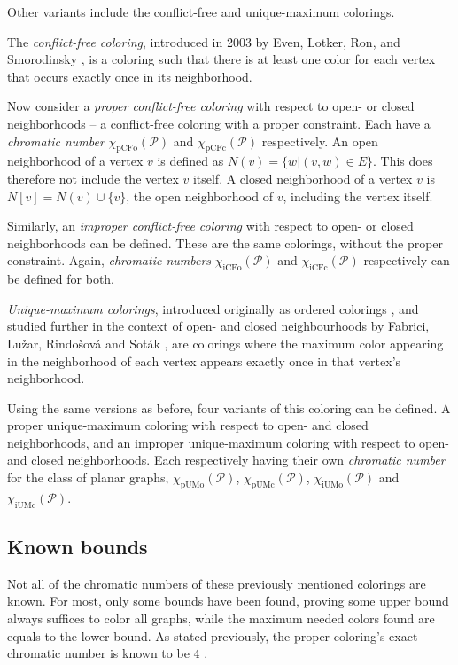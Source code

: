 \documentclass{article}
\begin{document}
Other variants include the conflict-free and unique-maximum colorings. 

The \textit{conflict-free coloring}, introduced in 2003 by Even, Lotker, Ron, and Smorodinsky \cite{even2003conflict}, is a coloring such that there is at least one color for each vertex that occurs exactly once in its neighborhood. 

Now consider a \textit{proper conflict-free coloring} with respect to open- or closed neighborhoods -- a conflict-free coloring with a proper constraint. Each have a \textit{chromatic number} $\chi_{\mathrm{pCFo}}(\mathcal{P})$ and $\chi_{\mathrm{pCFc}}(\mathcal{P})$ respectively.
An open neighborhood of a vertex $v$ is defined as $N(v) = \{w | (v, w) \in E\}$. This does therefore not include the vertex $v$ itself. A closed neighborhood of a vertex $v$ is $N[v] = N(v) \cup \{v\}$, the open neighborhood of $v$, including the vertex itself. 

Similarly, an \textit{improper conflict-free coloring} with respect to open- or closed neighborhoods can be defined. These are the same colorings, without the proper constraint. Again, \textit{chromatic numbers} $\chi_{\mathrm{iCFo}}(\mathcal{P})$ and $\chi_{\mathrm{iCFc}}(\mathcal{P})$ respectively can be defined for both.

\textit{Unique-maximum colorings}, introduced originally as ordered colorings \cite{KATCHALSKI1995141}, and studied further in the context of open- and closed neighbourhoods by Fabrici, Lužar, Rindošová and Soták \cite{fabrici2023proper}, are colorings where the maximum color appearing in the neighborhood of each vertex appears exactly once in that vertex's neighborhood.

Using the same versions as before, four variants of this coloring can be defined. A proper unique-maximum coloring with respect to open- and closed neighborhoods, and an improper unique-maximum coloring with respect to open- and closed neighborhoods. Each respectively having their own \textit{chromatic number} for the class of planar graphs, $\chi_{\mathrm{pUMo}}(\mathcal{P})$, $\chi_{\mathrm{pUMc}}(\mathcal{P})$, $\chi_{\mathrm{iUMo}}(\mathcal{P})$ and $\chi_{\mathrm{iUMc}}(\mathcal{P})$.

\subsection{Known bounds}

Not all of the chromatic numbers of these previously mentioned colorings are known. For most, only some bounds have been found, proving some upper bound always suffices to color all graphs, while the maximum needed colors found are equals to the lower bound. As stated previously, the proper coloring's exact chromatic number is known to be $4$ \cite{appel1976every}. 
\end{document}
